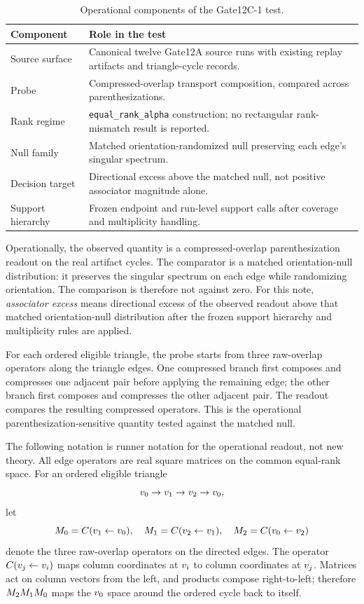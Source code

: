 \documentclass[11pt]{article}
\newcommand{\breakcode}[1]{\begingroup\urlstyle{tt}\nolinkurl{#1}\endgroup}
\begin{document}
\begin{table}[ht]
\centering
\small
\caption{Operational components of the Gate12C-1 test.}
\label{tab:method-components}
\begin{tabular}{|>{\raggedright\arraybackslash}p{}|>{\raggedright\arraybackslash}p{}|}
\hline
Component & Role in the test \\
\hline
Source surface & Canonical twelve Gate12A source runs with existing replay
artifacts and triangle-cycle records. \\
\hline
Probe & Compressed-overlap transport composition, compared across
parenthesizations. \\
\hline
Rank regime & \breakcode{equal_rank_alpha} construction; no rectangular rank-mismatch
result is reported. \\
\hline
Null family & Matched orientation-randomized null preserving each edge's
singular spectrum. \\
\hline
Decision target & Directional excess above the matched null, not positive
associator magnitude alone. \\
\hline
Support hierarchy & Frozen endpoint and run-level support calls after coverage
and multiplicity handling. \\
\hline
\end{tabular}
\end{table}

Operationally, the observed quantity is a compressed-overlap parenthesization
readout on the real artifact cycles. The comparator is a matched
orientation-null distribution: it preserves the singular spectrum on each edge
while randomizing orientation. The comparison is therefore not against zero.
For this note, \emph{associator excess} means directional excess of the
observed readout above that matched orientation-null distribution after the
frozen support hierarchy and multiplicity rules are applied.

For each ordered eligible triangle, the probe starts from three raw-overlap
operators along the triangle edges. One compressed branch first composes and
compresses one adjacent pair before applying the remaining edge; the other
branch first composes and compresses the other adjacent pair. The readout
compares the resulting compressed operators. This is the operational
parenthesization-sensitive quantity tested against the matched null.

The following notation is runner notation for the operational readout, not new
theory. All edge operators are real square matrices on the common equal-rank
space. For an ordered eligible triangle
\[
v\sb{0}\rightarrow v\sb{1}\rightarrow v\sb{2}\rightarrow v\sb{0},
\]
let
\[
M\sb{0}=C(v\sb{1}\leftarrow v\sb{0}),\quad
M\sb{1}=C(v\sb{2}\leftarrow v\sb{1}),\quad
M\sb{2}=C(v\sb{0}\leftarrow v\sb{2})
\]
denote the three raw-overlap operators on the directed edges. The operator
\(C(v\sb j\leftarrow v\sb i)\) maps column coordinates at \(v\sb i\) to
column coordinates at \(v\sb j\). Matrices act on column vectors from the
left, and products compose right-to-left; therefore
\(M\sb 2M\sb 1M\sb 0\) maps the \(v\sb 0\) space around the ordered cycle
back to itself.
\end{document}
